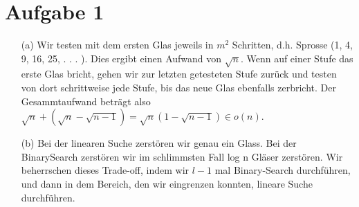 \documentclass{scrartcl}
\begin{document}
 
\section{Aufgabe 1} 
\begin{enumerate}
\item[(a)]
Wir testen mit dem ersten 
Glas jeweils in $m^2$ Schritten, d.h. Sprosse (1, 4, 9, 16, 25, . 
. . ). Dies ergibt einen Aufwand von $\sqrt{n}$. Wenn auf einer Stufe das 
erste Glas bricht, gehen wir zur letzten getesteten Stufe zurück 
und testen von dort schrittweise jede Stufe, bis das neue Glas 
ebenfalls zerbricht. Der Gesammtaufwand beträgt also $\sqrt{n} + (\sqrt{n} - \sqrt{n - 1}) = \sqrt{n}(1 - \sqrt{n - 1}) \in o(n)$.

\item[(b)] 
Bei der linearen Suche zerstören wir genau ein Glass. 
Bei der BinarySearch zerstören wir im schlimmsten Fall log n 
Gläser zerstören. Wir beherrschen dieses Trade-off, indem wir $l-1$ 
mal Binary-Search durchführen, und dann in dem Bereich, den wir 
eingrenzen konnten, lineare Suche durchführen.
\end{enumerate}
\end{document}
